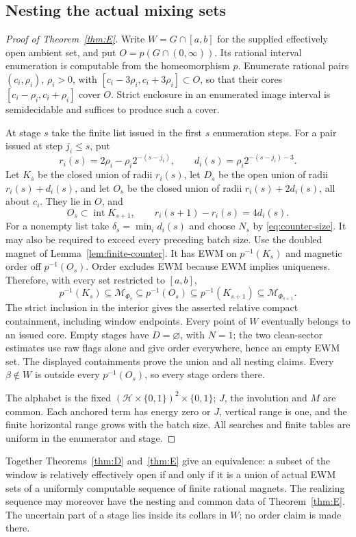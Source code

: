 \subsection{Nesting the actual mixing sets}

\begin{proof}[Proof of Theorem~\ref{thm:E}]
Write \(W=G\cap[a,b]\) for the supplied effectively open ambient set, and put \(O=p(G\cap(0,\infty))\). Its rational interval enumeration is computable from the homeomorphism \(p\). Enumerate rational pairs \((c_i,\rho_i)\), \(\rho_i>0\), with
\([c_i-3\rho_i,c_i+3\rho_i]\subset O\), so that their cores \([c_i-\rho_i,c_i+\rho_i]\) cover \(O\). Strict enclosure in an enumerated image interval is semidecidable and suffices to produce such a cover.

At stage \(s\) take the finite list issued in the first \(s\) enumeration steps. For a pair issued at step \(j_i\le s\), put
\[
r_i(s)=2\rho_i-\rho_i2^{-(s-j_i)},\qquad
d_i(s)=\rho_i2^{-(s-j_i)-3}.
\]
Let \(K_s\) be the closed union of radii \(r_i(s)\), let \(D_s\) be the open union of radii \(r_i(s)+d_i(s)\), and let \(O_s\) be the closed union of radii \(r_i(s)+2d_i(s)\), all about \(c_i\). They lie in \(O\), and
\[
O_s\subset\operatorname{int}K_{s+1},
\qquad r_i(s+1)-r_i(s)=4d_i(s).
\]
For a nonempty list take \(\delta_s=\min_i d_i(s)\) and choose \(N_s\) by \eqref{eq:counter-size}. It may also be required to exceed every preceding batch size. Use the doubled magnet of Lemma~\ref{lem:finite-counter}. It has EWM on \(p^{-1}(K_s)\) and magnetic order off \(p^{-1}(O_s)\). Order excludes EWM because EWM implies uniqueness. Therefore, with every set restricted to \([a,b]\),
\begin{equation}\label{eq:actual-nesting}
p^{-1}(K_s)\subseteq\mathcal M_{\Phi_s}
\subseteq p^{-1}(O_s)\subseteq p^{-1}(K_{s+1})
\subseteq\mathcal M_{\Phi_{s+1}}.
\end{equation}
The strict inclusion in the interior gives the asserted relative compact containment, including window endpoints. Every point of \(W\) eventually belongs to an issued core. Empty stages have \(D=\varnothing\), with \(N=1\); the two clean-sector estimates use raw flags alone and give order everywhere, hence an empty EWM set. The displayed containments prove the union and all nesting claims. Every \(\beta\notin W\) is outside every \(p^{-1}(O_s)\), so every stage orders there.

The alphabet is the fixed \((\mathcal H\times\{0,1\})^2\times\{0,1\}\); \(J\), the involution and \(M\) are common. Each anchored term has energy zero or \(J\), vertical range is one, and the finite horizontal range grows with the batch size. All searches and finite tables are uniform in the enumerator and stage.
\end{proof}

Together Theorems~\ref{thm:D} and~\ref{thm:E} give an equivalence: a subset of the window is relatively effectively open if and only if it is a union of actual EWM sets of a uniformly computable sequence of finite rational magnets. The realizing sequence may moreover have the nesting and common data of Theorem~\ref{thm:E}. The uncertain part of a stage lies inside its collars in \(W\); no order claim is made there.
